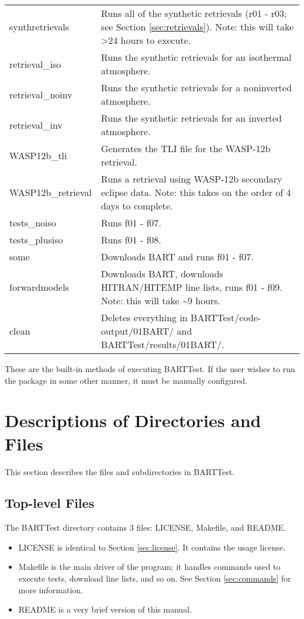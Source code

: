 \documentclass[letterpaper, 12pt]{article}
\begin{document}
\begin{table}[ht]
\begin{tabular}{ll}
synthretrievals & Runs all of the synthetic retrievals (r01 - r03; see Section \ref{sec:retrievals}). Note: this will take {\textgreater}24 hours to execute.\\
retrieval{\_}iso & Runs the synthetic retrievals for an isothermal atmosphere.\\
retrieval{\_}noinv & Runs the synthetic retrievals for a noninverted atmosphere.\\
retrieval{\_}inv & Runs the synthetic retrievals for an inverted atmosphere.\\
WASP12b{\_}tli & Generates the TLI file for the WASP-12b retrieval.\\
WASP12b{\_}retrieval & Runs a retrieval using WASP-12b secondary eclipse data. Note: this takes on the order of 4 days to complete.\\
tests{\_}noiso & Runs f01 - f07.\\
tests{\_}plusiso & Runs f01 - f08.\\
some & Downloads BART and runs f01 - f07.\\
forwardmodels & Downloads BART, downloads HITRAN/HITEMP line lists, runs f01 - f09. Note: this will take {\sim}9 hours.\\
clean & Deletes everything in BARTTest/code-output/01BART/ and BARTTest/results/01BART/.\\
\hline
\end{tabular}
\end{table}

These are the built-in methods of executing BARTTest. If the user wishes to 
run the package in some other manner, it must be manually configured.

\section{Descriptions of Directories and Files}
\label{sec:files}

This section describes the files and subdirectories in BARTTest.

\subsection{Top-level Files}
The BARTTest directory contains 3 files: LICENSE, Makefile, and README.

\begin{itemize} \itemsep0pt
    \item LICENSE is identical to Section \ref{sec:license}. It contains the usage license.
    \item Makefile is the main driver of the program; it handles commands used 
to execute tests, download line lists, and so on. See Section 
\ref{sec:commands} for more information.
    \item README is a very brief version of this manual.
\end{itemize}
\end{document}
